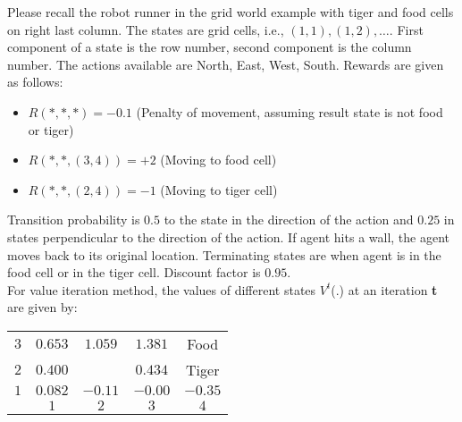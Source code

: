 \item Please recall the robot runner in the grid world example with tiger and food cells on right last column. The states are grid cells, i.e., $(1,1), (1,2), \ldots$. First component of a state is the row number, second component is the column number. The actions available are North, East, West, South. Rewards are given as follows:
\begin{itemize}
  \item $R(*,*,*)=-0.1$ (Penalty of movement, assuming result state is not food or tiger)
  \item $R(*,*,(3,4))=+2$ (Moving to food cell)
  \item $R(*,*,(2,4))=-1$ (Moving to tiger cell)
\end{itemize}
Transition probability is $0.5$ to the state in the direction of the action and $0.25$ in states perpendicular to the direction of the action. If agent hits a wall, the agent moves back to its original location. Terminating states are when agent is in the food cell or in the tiger cell. Discount factor is $0.95$.\\
For value iteration method, the values of different states $V^t$(.) at an iteration \textbf{t} are given by:
\begin{center}
  \bgroup
  \def\arraystretch{1.5}%
  \begin{tabular}{|c|c|c|c|c|}
    \hline
    $3$ & $0.653$ & $1.059$              & $1.381$ & Food    \\
    $2$ & $0.400$ & \cellcolor[gray]{.1} & $0.434$ & Tiger   \\
    $1$ & $0.082$ & $-0.11$              & $-0.00$ & $-0.35$ \\
    \hline
        & $1$     & $2$                  & $3$     & $4$     \\
    \hline
  \end{tabular}
  \egroup
\end{center}
